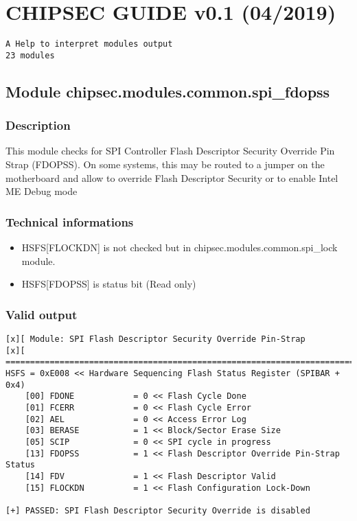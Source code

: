 \hypertarget{chipsec-guide-v0.1-042019}{%
\section{CHIPSEC GUIDE v0.1 (04/2019)}\label{chipsec-guide-v0.1-042019}}

\begin{verbatim}
A Help to interpret modules output
23 modules
\end{verbatim}

\hypertarget{module-chipsec.modules.common.spi_fdopss}{%
\subsection{Module
chipsec.modules.common.spi\_fdopss}\label{module-chipsec.modules.common.spi_fdopss}}

\hypertarget{description}{%
\subsubsection{Description}\label{description}}

This module checks for SPI Controller Flash Descriptor Security Override
Pin Strap (FDOPSS). On some systems, this may be routed to a jumper on
the motherboard and allow to override Flash Descriptor Security or to
enable Intel ME Debug mode

\hypertarget{technical-informations}{%
\subsubsection{Technical informations}\label{technical-informations}}

\begin{itemize}
\tightlist
\item
  HSFS{[}FLOCKDN{]} is not checked but in
  chipsec.modules.common.spi\_lock module.
\item
  HSFS{[}FDOPSS{]} is status bit (Read only)
\end{itemize}

\hypertarget{valid-output}{%
\subsubsection{Valid output}\label{valid-output}}

\begin{verbatim}
[x][ Module: SPI Flash Descriptor Security Override Pin-Strap
[x][ =======================================================================
HSFS = 0xE008 << Hardware Sequencing Flash Status Register (SPIBAR + 0x4)
    [00] FDONE            = 0 << Flash Cycle Done 
    [01] FCERR            = 0 << Flash Cycle Error 
    [02] AEL              = 0 << Access Error Log 
    [03] BERASE           = 1 << Block/Sector Erase Size 
    [05] SCIP             = 0 << SPI cycle in progress 
    [13] FDOPSS           = 1 << Flash Descriptor Override Pin-Strap Status 
    [14] FDV              = 1 << Flash Descriptor Valid 
    [15] FLOCKDN          = 1 << Flash Configuration Lock-Down
  
[+] PASSED: SPI Flash Descriptor Security Override is disabled
\end{verbatim}

